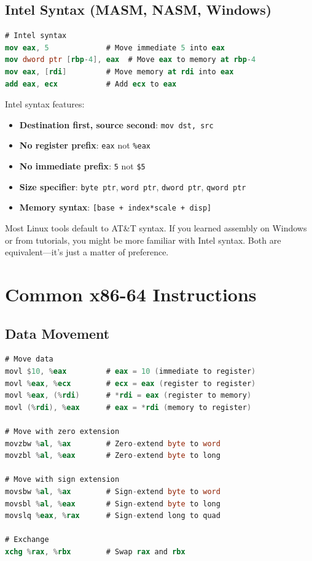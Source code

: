 \subsection{Intel Syntax (MASM, NASM, Windows)}

\begin{lstlisting}[language=nasm]
# Intel syntax
mov eax, 5             # Move immediate 5 into eax
mov dword ptr [rbp-4], eax  # Move eax to memory at rbp-4
mov eax, [rdi]         # Move memory at rdi into eax
add eax, ecx           # Add ecx to eax
\end{lstlisting}

Intel syntax features:
\begin{itemize}
    \item \textbf{Destination first, source second}: \texttt{mov dst, src}
    \item \textbf{No register prefix}: \texttt{eax} not \texttt{\%eax}
    \item \textbf{No immediate prefix}: \texttt{5} not \texttt{\$5}
    \item \textbf{Size specifier}: \texttt{byte ptr}, \texttt{word ptr}, \texttt{dword ptr}, \texttt{qword ptr}
    \item \textbf{Memory syntax}: \texttt{[base + index*scale + disp]}
\end{itemize}

\begin{tip}
Most Linux tools default to AT\&T syntax. If you learned assembly on Windows or from tutorials, you might be more familiar with Intel syntax. Both are equivalent—it's just a matter of preference.
\end{tip}

\section{Common x86-64 Instructions}

\subsection{Data Movement}

\begin{lstlisting}[language=nasm]
# Move data
movl $10, %eax         # eax = 10 (immediate to register)
movl %eax, %ecx        # ecx = eax (register to register)
movl %eax, (%rdi)      # *rdi = eax (register to memory)
movl (%rdi), %eax      # eax = *rdi (memory to register)

# Move with zero extension
movzbw %al, %ax        # Zero-extend byte to word
movzbl %al, %eax       # Zero-extend byte to long

# Move with sign extension
movsbw %al, %ax        # Sign-extend byte to word
movsbl %al, %eax       # Sign-extend byte to long
movslq %eax, %rax      # Sign-extend long to quad

# Exchange
xchg %rax, %rbx        # Swap rax and rbx
\end{lstlisting}

